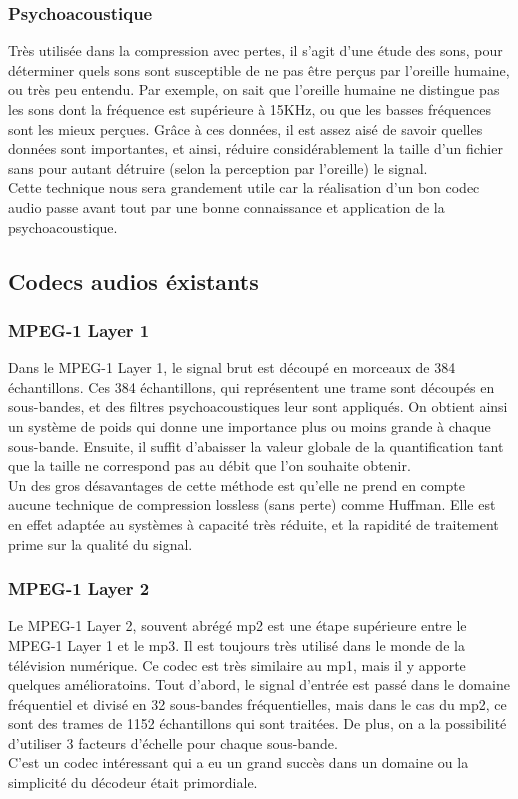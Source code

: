 		\subsubsection{Psychoacoustique}
Très utilisée dans la compression avec pertes, il s'agit d'une étude des
sons,  pour déterminer quels sons sont susceptible de ne pas être perçus
par l'oreille humaine,  ou très  peu entendu.  Par exemple,  on sait que
l'oreille  humaine ne  distingue pas  les  sons  dont  la  fréquence est
supérieure à 15KHz, ou que les basses fréquences sont les mieux perçues.
Grâce à ces  données,  il est assez aisé de  savoir quelles données sont
importantes,  et ainsi,  réduire considérablement la taille d'un fichier
sans  pour  autant  détruire  (selon  la  perception  par  l'oreille) le
signal.\\
Cette technique nous  sera grandement utile car la  réalisation d'un bon
codec audio passe  avant tout par une bonne  connaissance et application
de la psychoacoustique.

\newpage

	\subsection{Codecs audios éxistants}

		\subsubsection{MPEG-1 Layer 1}
Dans le MPEG-1  Layer 1,  le signal brut est découpé  en morceaux de 384
échantillons.  Ces  384 échantillons,  qui  représentent une  trame sont
découpés en  sous-bandes,  et  des  filtres  psychoacoustiques leur sont
appliqués.   On  obtient  ainsi  un  système  de  poids  qui  donne  une
importance plus ou moins grande à chaque sous-bande.  Ensuite, il suffit
d'abaisser la valeur globale de la  quantification tant que la taille ne
correspond pas au débit que l'on souhaite obtenir.\\
Un des gros désavantages de cette méthode est qu'elle ne prend en compte
aucune  technique de  compression lossless  (sans perte)  comme Huffman.
Elle est  en effet adaptée au  systèmes à capacité  très réduite,  et la
rapidité de traitement prime sur la qualité du signal.

		\subsubsection{MPEG-1 Layer 2}
Le MPEG-1 Layer 2,  souvent abrégé mp2 est une étape supérieure entre le
MPEG-1 Layer 1 et le mp3.  Il est toujours très utilisé dans le monde de
la télévision numérique.  Ce codec est très similaire au mp1,  mais il y
apporte quelques  amélioratoins.  Tout d'abord,  le signal  d'entrée est
passé  dans  le   domaine  fréquentiel  et  divisé   en  32  sous-bandes
fréquentielles,  mais dans  le cas du  mp2,  ce sont des  trames de 1152
échantillons qui sont traitées.  De plus, on a la possibilité d'utiliser
3 facteurs d'échelle pour chaque sous-bande.\\
C'est un codec intéressant  qui a eu un grand succès  dans un domaine ou
la simplicité du décodeur était primordiale.

